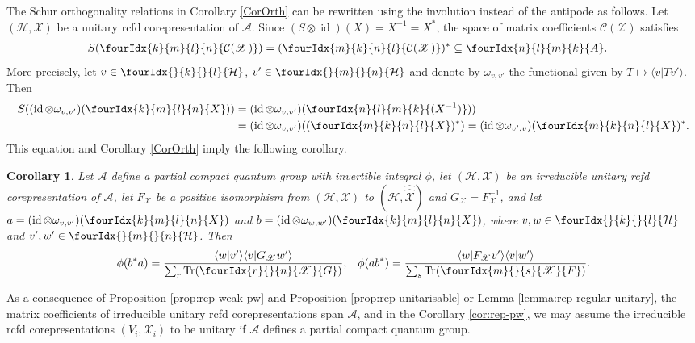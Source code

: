\documentclass[11pt]{article}
\DeclareMathOperator{\id}{id}
\newcommand{\dualco}[1]{\hat{#1}}
\newcommand{\Hsp}{\mathcal{H}}
\newcommand{\Tr}{\mathrm{Tr}}
\newcommand{\Gr}[5]{\fourIdx{#2}{#4}{#3}{#5}{#1}}%
\newcommand{\Gru}[3]{\Gr{#1}{}{}{#2}{#3}}
\newtheorem{Cor}[Theorem]{Corollary}
\theoremstyle{definition}
\numberwithin{equation}{section}
\begin{document}
The Schur orthogonality relations in Corollary \ref{CorOrth} can be
rewritten using the involution instead of the antipode as follows.
Let $(\Hsp,\mathscr{X})$ be a unitary rcfd corepresentation of
$\mathscr{A}$. Since $(S\otimes \id)(X)=X^{-1}=X^{*}$, the space of
matrix coefficients $\mathcal{C}(\mathscr{X})$ satisfies
\begin{align} \label{eq:rep-unitary-matrix-coefficients}
  S(\Gr{\mathcal{C}(\mathscr{X})}{k}{l}{m}{n}) &=
  (\Gr{\mathcal{C}(\mathscr{X})}{m}{n}{k}{l})^{*} \subseteq \Gr{A}{n}{m}{l}{k}.
\end{align}
More precisely, let $v \in \Gru{\Hsp}{k}{l}$, $v' \in \Gru{\Hsp}{m}{n}$
and denote by $\omega_{v,v'}$ the functional
given by $T \mapsto \langle v|Tv'\rangle$. Then
\begin{align*}
  S((\id \otimes \omega_{v,v'})(\Gr{X}{k}{l}{m}{n})) &=
  (\id \otimes \omega_{v,v'}) (\Gr{(X^{-1})}{n}{m}{l}{k})) \\ & =
  (\id \otimes \omega_{v,v'})( (\Gr{X}{m}{n}{k}{l})^{*}) =
  (\id \otimes \omega_{v',v})(\Gr{X}{m}{n}{k}{l})^{*}.
\end{align*}
This equation and Corollary \ref{CorOrth} imply the following corollary.
\begin{Cor}\label{cor:rep-unitary-schur-orthogonality}
  Let $\mathscr{A}$ define a partial compact quantum group with
  invertible integral $\phi$, let $(\Hsp,\mathscr{X})$ be an irreducible
  unitary rcfd corepresentation of $\mathscr{A}$, let $F_{\mathscr{X}}$ be a positive
  isomorphism from $(\Hsp,\mathscr{X})$ to
  $(\Hsp,\dualco{\dualco{\mathscr{X}}})$ and
  $G_{\mathscr{X}}=F^{-1}_{{\mathscr{X}}}$, and let $a=(\id \otimes
  \omega_{v,v'})(\Gr{X}{k}{l}{m}{n})$ and $b=(\id \otimes
  \omega_{w,w'})(\Gr{X}{k}{l}{m}{n})$, where $v,w \in
  \Gru{\Hsp}{k}{l}$ and $v',w' \in \Gru{\Hsp}{m}{n}$.  Then
\begin{align*}
  \phi(b^{*}a) &= \frac{\langle w|v'\rangle\langle v|G_{\mathscr{X}}w'\rangle}{\sum_{r}
    \Tr(\Gr{G}{r}{n}{}{\mathscr{X}})}, & \phi(ab^{*}) = \frac{\langle
    w|F_{\mathscr{X}}v'\rangle \langle v|w'\rangle}{\sum_{s}
    \Tr(\Gr{F}{m}{s}{}{\mathscr{X}})}.
\end{align*}
\end{Cor}
As a consequence of Proposition \ref{prop:rep-weak-pw} and Proposition
\ref{prop:rep-unitarisable} or Lemma \ref{lemma:rep-regular-unitary},
the matrix coefficients of irreducible unitary rcfd corepresentations
span $\mathscr{A}$, and in the Corollary \ref{cor:rep-pw}, we may
assume the irreducible rcfd corepresentations
$(V_{i},\mathscr{X}_{i})$ to be unitary if $\mathscr{A}$
defines a partial compact quantum group.
\end{document}
